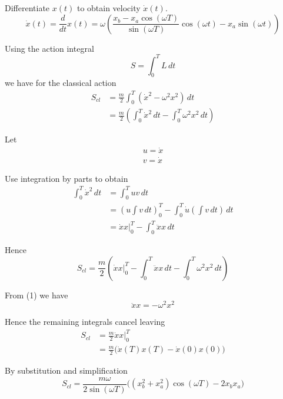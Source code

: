 \documentclass[12pt]{article}
\begin{document}
Differentiate $x(t)$ to obtain velocity $\dot x(t)$.
\begin{equation*}
\dot x(t)=\frac{d}{dt}x(t)=
\omega\left(
\frac{x_b-x_a\cos(\omega T)}{\sin(\omega T)}\cos(\omega t)-x_a\sin(\omega t)
\right)
\tag{3}
\end{equation*}

Using the action integral
\begin{equation*}
S=\int_0^T L\,dt
\end{equation*}
we have for the classical action
\begin{align*}
S_{cl}&=\frac{m}{2}\int_0^T (\dot{x}^2-\omega^2 x^2)\,dt
\\[1ex]
&=\frac{m}{2}\left(
\int_0^T\dot{x}^2\,dt
-\int_0^T\omega^2x^2\,dt\right)
\end{align*}

Let
\begin{align*}
u=\dot x
\\
v=\dot x
\end{align*}

Use integration by parts to obtain
\begin{align*}
\int_0^T \dot x^2\,dt
&=\int_0^T uv\,dt
\\
&=\left(u\int v\,dt\right)_0^T
-\int_0^T\dot u\left(\int v\,dt\right)\,dt
\\
&=\dot xx\bigg|_0^T-\int_0^T \ddot xx\,dt
\end{align*}

Hence
\begin{equation*}
S_{cl}=\frac{m}{2}\left(
\dot xx\bigg|_0^T-\int_0^T \ddot xx\,dt
-\int_0^T\omega^2x^2\,dt
\right)
\end{equation*}

From (1) we have
\begin{equation*}
\ddot xx=-\omega^2 x^2
\end{equation*}

Hence the remaining integrals cancel leaving
\begin{align*}
S_{cl}&=\frac{m}{2}\dot xx\bigg|_0^T
\\
&=\frac{m}{2}\bigg(\dot x(T)x(T)-\dot x(0)x(0)\bigg)
\tag{4}
\end{align*}

By substitution and simplification
\begin{equation*}
S_{cl}=\frac{m\omega}{2\sin(\omega T)}
\bigg((x_b^2+x_a^2)\cos(\omega T)-2x_b x_a\bigg)
\tag{5}
\end{equation*}
\end{document}
